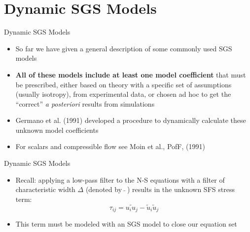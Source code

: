 \section{Dynamic SGS Models} %
\begin{frame}{Dynamic SGS Models}
\begin{itemize}
	\item So far we have given a general description of some commonly used SGS models
	\item \textbf{All of these models include at least one model coefficient} that must be prescribed, either based on theory with a specific set of assumptions (usually isotropy), from experimental data, or chosen ad hoc to get the ``correct'' \textit{a posteriori} results from simulations
	\item  Germano et al. (1991) developed a procedure to dynamically calculate these unknown model coefficients
	\item For scalars and compressible flow see Moin et al., PofF, (1991)
\end{itemize}

\end{frame}

\begin{frame}{Dynamic SGS Models}
\begin{itemize}
	\item  Recall: applying a low-pass filter to the N-S equations with a filter of characteristic width $\Delta$ (denoted by $\widetilde{\ \ }$) results in the unknown SFS stress term:
	\begin{equation}
	\label{sfs1}
	\boxed{\tau_{ij} = \widetilde{u_iu_j} - \widetilde{u}_i \widetilde{u}_j}
	\end{equation}
	\item This term must be modeled with an SGS model to close our equation set
\end{itemize}

\end{frame}

